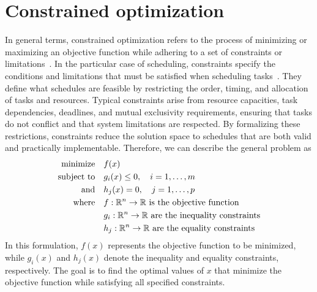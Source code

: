\section{Constrained optimization}
In general terms, constrained optimization refers to the process of minimizing or maximizing an objective function while adhering to a set of constraints or limitations~\cite{bib:2014-bertsekas}. In the particular case of scheduling, constraints specify the conditions and limitations that must be satisfied when scheduling tasks~\cite{bib:2017-diveev}. They define what schedules are feasible by restricting the order, timing, and allocation of tasks and resources. Typical constraints arise from resource capacities, task dependencies, deadlines, and mutual exclusivity requirements, ensuring that tasks do not conflict and that system limitations are respected. By formalizing these restrictions, constraints reduce the solution space to schedules that are both valid and practically implementable. Therefore, we can describe the general problem as
\begin{align*}
    \text{minimize} \quad   & f(x)                                                    \\
    \text{subject to} \quad & g_i(x) \leq 0, \quad i = 1, \ldots, m                   \\
    \text{and} \quad        & h_j(x) = 0, \quad j = 1, \ldots, p                      \\
    \text{where} \quad      & f: \mathbb{R}^n \to \mathbb{R} \text{ is the objective function}        \\
                            & g_i: \mathbb{R}^n \to \mathbb{R} \text{ are the inequality constraints} \\
                            & h_j: \mathbb{R}^n \to \mathbb{R} \text{ are the equality constraints}
\end{align*}
In this formulation, $f(x)$ represents the objective function to be minimized, while $g_i(x)$ and $h_j(x)$ denote the inequality and equality constraints, respectively. The goal is to find the optimal values of $x$ that minimize the objective function while satisfying all specified constraints.

